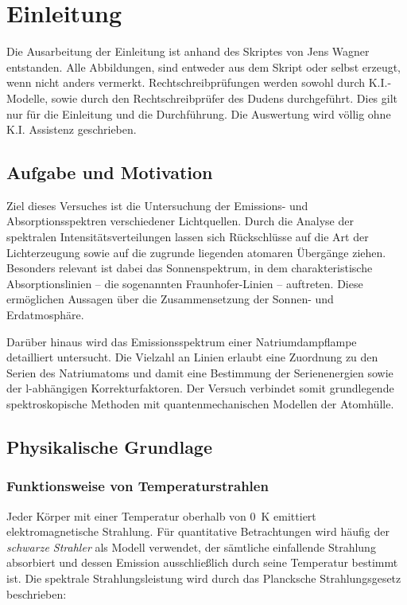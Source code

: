 \chapter{Einleitung}\label{ch:Einleitung}

Die Ausarbeitung der Einleitung ist anhand des Skriptes von Jens Wagner entstanden. Alle Abbildungen, sind entweder aus dem Skript oder selbst erzeugt, wenn nicht anders vermerkt. Rechtschreibprüfungen werden sowohl durch K.I.-Modelle, sowie durch den Rechtschreibprüfer des Dudens durchgeführt.  Dies gilt nur für die Einleitung und die Durchführung. Die Auswertung wird völlig ohne K.I. Assistenz geschrieben. \cite{skriptPAP21, Duden}

\section{Aufgabe und Motivation} \label{sec:AuM}

Ziel dieses Versuches ist die Untersuchung der Emissions- und Absorptionsspektren verschiedener Lichtquellen. Durch die Analyse der spektralen Intensitätsverteilungen lassen sich Rückschlüsse auf die Art der Lichterzeugung sowie auf die zugrunde liegenden atomaren Übergänge ziehen. Besonders relevant ist dabei das Sonnenspektrum, in dem charakteristische Absorptionslinien – die sogenannten Fraunhofer-Linien – auftreten. Diese ermöglichen Aussagen über die Zusammensetzung der Sonnen- und Erdatmosphäre. 


Darüber hinaus wird das Emissionsspektrum einer Natriumdampflampe detailliert untersucht. Die Vielzahl an Linien erlaubt eine Zuordnung zu den Serien des Natriumatoms und damit eine Bestimmung der Serienenergien sowie der l-abhängigen Korrekturfaktoren. Der Versuch verbindet somit grundlegende spektroskopische Methoden mit quantenmechanischen Modellen der Atomhülle.

\section{Physikalische Grundlage} \label{sec:PhyBasics}

\subsection[Temperaturstrahler]{Funktionsweise von Temperaturstrahlen}
Jeder Körper mit einer Temperatur oberhalb von \SI{0}{\kelvin} emittiert elektromagnetische Strahlung. Für quantitative Betrachtungen wird häufig der \emph{schwarze Strahler} als Modell verwendet, der sämtliche einfallende Strahlung absorbiert und dessen Emission ausschließlich durch seine Temperatur bestimmt ist. Die spektrale Strahlungsleistung wird durch das Plancksche Strahlungsgesetz beschrieben:

